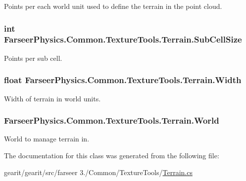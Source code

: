 Points per each world unit used to define the terrain in the point cloud. 

\hypertarget{class_farseer_physics_1_1_common_1_1_texture_tools_1_1_terrain_a86998ad7b5fe2aa74271d8297c990f8c}{
\subsubsection[{Sub\+Cell\+Size}]{\setlength{\rightskip}{0pt plus 5cm}int Farseer\+Physics.\+Common.\+Texture\+Tools.\+Terrain.\+Sub\+Cell\+Size}}\label{class_farseer_physics_1_1_common_1_1_texture_tools_1_1_terrain_a86998ad7b5fe2aa74271d8297c990f8c}


Points per sub cell. 

\hypertarget{class_farseer_physics_1_1_common_1_1_texture_tools_1_1_terrain_a974e47af69f91855f81c9d935dd3beba}{
\subsubsection[{Width}]{\setlength{\rightskip}{0pt plus 5cm}float Farseer\+Physics.\+Common.\+Texture\+Tools.\+Terrain.\+Width}}\label{class_farseer_physics_1_1_common_1_1_texture_tools_1_1_terrain_a974e47af69f91855f81c9d935dd3beba}


Width of terrain in world units. 

\hypertarget{class_farseer_physics_1_1_common_1_1_texture_tools_1_1_terrain_a0ae192f42273d75c06f6212871a485ab}{
\subsubsection[{World}]{ Farseer\+Physics.\+Common.\+Texture\+Tools.\+Terrain.\+World}}\label{class_farseer_physics_1_1_common_1_1_texture_tools_1_1_terrain_a0ae192f42273d75c06f6212871a485ab}


World to manage terrain in. 



The documentation for this class was generated from the following file\+:\begin{DoxyCompactItemize}
\item 
gearit/gearit/src/farseer 3./\+Common/\+Texture\+Tools/\hyperlink{_terrain_8cs}{Terrain.\+cs}\end{DoxyCompactItemize}
